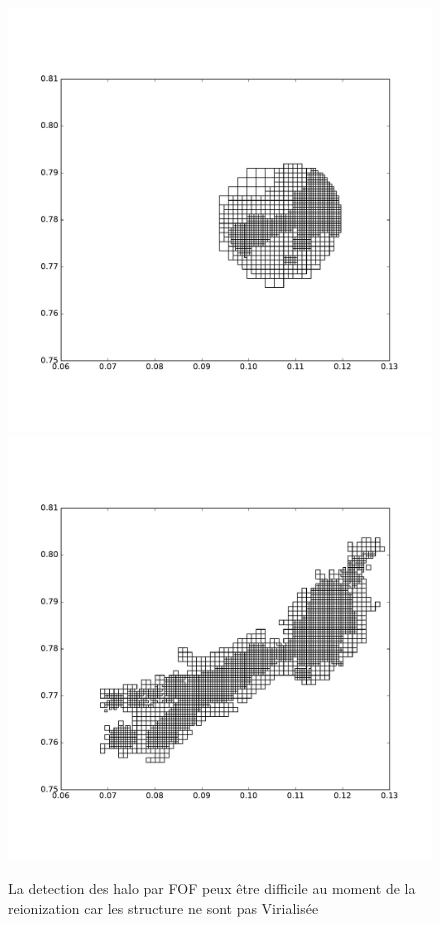 \begin{figure}[bth]
        \includegraphics[width=.95\textwidth]{img/03/part_cells.pdf} 
        \includegraphics[width=.95\textwidth]{img/03/part_cells_fine.pdf} 
        \caption{La detection des halo par FOF peux être difficile au moment de la reionization car les structure ne sont pas Virialisée
        }
 		\label{fig:part_halo}
\end{figure}




